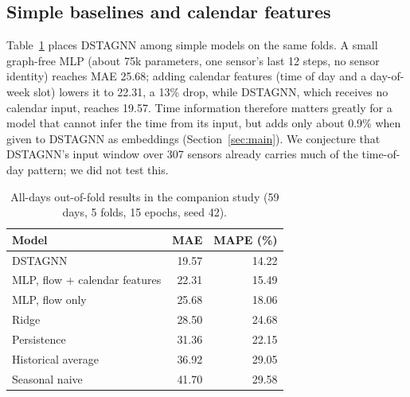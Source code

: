 \documentclass[conference]{IEEEtran}
\begin{document}
\subsection{Simple baselines and calendar features}
Table~\ref{tab:oof} places DSTAGNN among simple models on the same folds. A small graph-free MLP (about 75k parameters, one sensor's last 12 steps, no sensor identity) reaches MAE 25.68; adding calendar features (time of day and a day-of-week slot) lowers it to 22.31, a 13\% drop, while DSTAGNN, which receives no calendar input, reaches 19.57. Time information therefore matters greatly for a model that cannot infer the time from its input, but adds only about 0.9\% when given to DSTAGNN as embeddings (Section~\ref{sec:main}). We conjecture that DSTAGNN's input window over 307 sensors already carries much of the time-of-day pattern; we did not test this.
\begin{table}[t]
\centering\caption{All-days out-of-fold results in the companion study (59 days, 5 folds, 15 epochs, seed 42).}\label{tab:oof}
\footnotesize
\begin{tabular}{@{}lrr@{}}
\toprule
Model & MAE & MAPE (\%)\\
\midrule
DSTAGNN & 19.57 & 14.22\\
MLP, flow + calendar features & 22.31 & 15.49\\
MLP, flow only & 25.68 & 18.06\\
Ridge & 28.50 & 24.68\\
Persistence & 31.36 & 22.15\\
Historical average & 36.92 & 29.05\\
Seasonal naive & 41.70 & 29.58\\
\bottomrule
\end{tabular}
\end{table}
\end{document}
